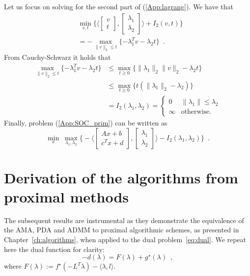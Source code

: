\documentclass[openany]{now}
\begin{document}
Let us focus on solving for the second part of (\ref{App:lagrang}). We have that
\begin{align*}
 &\underset{v,t}{\min} \{ \langle \left[\begin{array}{c}v\\t\end{array}\right],\left[\begin{array}{c}\lambda_1\\\lambda_2\end{array}\right]\rangle  + I_2(v,t)\}\\
 &=-\underset{\|v\|_2\le t}{\max} \{ -\lambda_1^Tv-\lambda_2 t \}\enspace.
\end{align*}
From Cauchy-Schwarz it holds that
\begin{align}
  \underset{\|v\|_2\le t}{\max} \{ -\lambda_1^Tv-\lambda_2 t \} &\le \underset{t\ge 0}{\max} \{ \|\lambda_1\|_2\|v\|_2-\lambda_2 t \}\\
                                                                &\le \underset{t\ge 0}{\max} \{ t(\|\lambda_1\|_2-\lambda_2) \}\\
                                                                & = I_2(\lambda_1,\lambda_2) = \left\{ \begin{array}{ll} 0 & \|\lambda_1\|\le\lambda_2 \\
                                                                                                                    \infty & \mbox{otherwise}.
                                                                                                      \end{array} \right.
\end{align}
Finally, problem (\ref{App:SOC_prim}) can be written as
\begin{equation}
\underset{x}{\min}\;\underset{\lambda_1,\lambda_2}{\max} \Big\{-\langle \left[\begin{array}{c}Ax+b\\c^Tx+d\end{array}\right],\left[\begin{array}{c}\lambda_1\\\lambda_2\end{array}\right]\rangle  - I_2(\lambda_1,\lambda_2)\Big\}\enspace.
\end{equation}
\fi



\chapter{Derivation of the algorithms from proximal methods}{\label{App::AlgsDerivations}}
The subsequent results are instrumental as they demonstrate the equivalence of the AMA, PDA and ADMM to proximal algorithmic schemes, as presented in Chapter~\ref{ch:algorithms}, when applied to the dual problem~\eqref{eq:dual}. We repeat here the dual function for clarity:
\begin{equation*}   
  -d(\lambda) =  F(\lambda) + g^\star(\lambda)\enspace,
\end{equation*}
where $F(\lambda):=f^\star(-L^T\lambda) - \langle  \lambda,l\rangle $.
\end{document}
